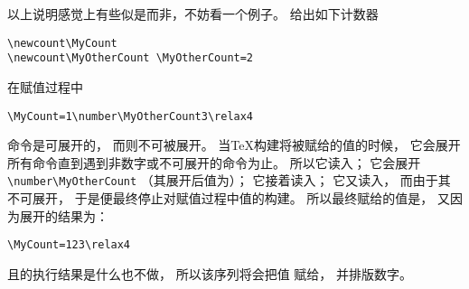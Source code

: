 \documentclass{book}
\begin{document}
以上说明感觉上有些似是而非，不妨看一个例子。
给出如下计数器
\begin{verbatim}
\newcount\MyCount
\newcount\MyOtherCount \MyOtherCount=2
\end{verbatim}
在赋值过程中
\begin{verbatim}
\MyCount=1\number\MyOtherCount3\relax4
\end{verbatim}
命令是可展开的，
而则不可被展开。
当{\TeX}构建将被赋给的值的时候，
它会展开所有命令直到遇到非数字或不可展开的命令为止。
所以它读入；
它会展开\verb>\number\MyOtherCount>
（其展开后值为）；
它接着读入；
它又读入，
而由于其不可展开，
于是便最终停止对赋值过程中值的构建。
所以最终赋给的值是，
又因为展开的结果为：
\begin{verbatim}
\MyCount=123\relax4
\end{verbatim}
且的执行结果是什么也不做，
所以该序列将会把值
赋给，
并排版数字。
\end{document}
